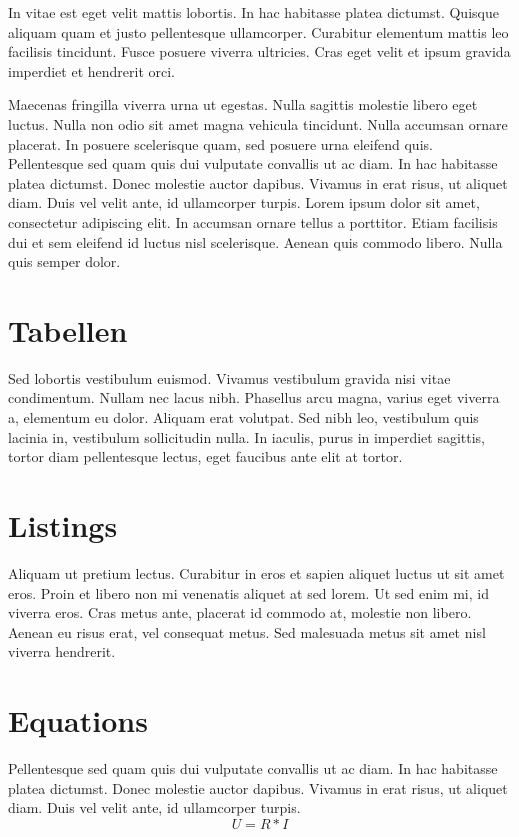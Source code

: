 In vitae est eget velit mattis lobortis. In hac habitasse platea dictumst. Quisque aliquam quam et justo pellentesque ullamcorper. Curabitur elementum mattis leo facilisis tincidunt. Fusce posuere viverra ultricies. Cras eget velit et ipsum gravida imperdiet et hendrerit orci.

Maecenas fringilla viverra urna ut egestas. Nulla sagittis molestie libero eget luctus. Nulla non odio sit amet magna vehicula tincidunt. Nulla accumsan ornare placerat. In posuere scelerisque quam, sed posuere urna eleifend quis. Pellentesque sed quam quis dui vulputate convallis ut ac diam. In hac habitasse platea dictumst. Donec molestie auctor dapibus. Vivamus in erat risus, ut aliquet diam. Duis vel velit ante, id ullamcorper turpis. Lorem ipsum dolor sit amet, consectetur adipiscing elit. In accumsan ornare tellus a porttitor. Etiam facilisis dui et sem eleifend id luctus nisl scelerisque. Aenean quis commodo libero. Nulla quis semper dolor.

%
%
\section{Tabellen}
\label{sec:chapter03:tabellen}
Sed lobortis vestibulum euismod. Vivamus vestibulum gravida nisi vitae condimentum. Nullam nec lacus nibh. Phasellus arcu magna, varius eget viverra a, elementum eu dolor. Aliquam erat volutpat. Sed nibh leo, vestibulum quis lacinia in, vestibulum sollicitudin nulla. In iaculis, purus in imperdiet sagittis, tortor diam pellentesque lectus, eget faucibus ante elit at tortor.

%
%
\section{Listings}
\label{sec:chapter03:listings}
Aliquam ut pretium lectus. Curabitur in eros et sapien aliquet luctus ut sit amet eros. Proin et libero non mi venenatis aliquet at sed lorem. Ut sed enim mi, id viverra eros. Cras metus ante, placerat id commodo at, molestie non libero. Aenean eu risus erat, vel consequat metus. Sed malesuada metus sit amet nisl viverra hendrerit.


%
%
\section{Equations}
\label{sec:chapter03:equations}
Pellentesque sed quam quis dui vulputate convallis ut ac diam. In hac habitasse platea dictumst. Donec molestie auctor dapibus. Vivamus in erat risus, ut aliquet diam. Duis vel velit ante, id ullamcorper turpis.
%
\begin{equation}
 U = R * I
\end{equation}

